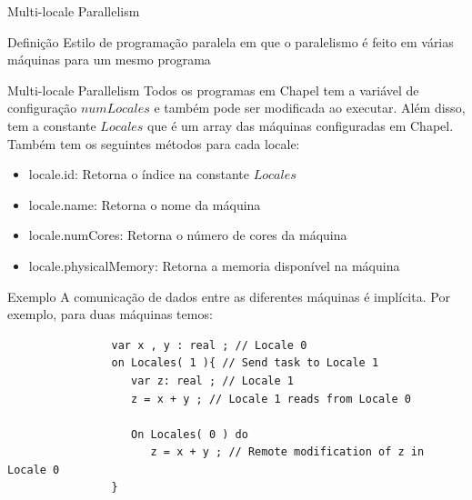 		\begin{frame}[fragile]{Multi-locale Parallelism}
			\begin{block}{Definição}
				Estilo de programação paralela em que o paralelismo é feito em várias máquinas para um mesmo programa
			\end{block}
		\end{frame}
		\begin{frame}{Multi-locale Parallelism}
			Todos os programas em Chapel tem a variável de configuração $numLocales$ e também pode ser modificada ao executar. Além disso, tem a constante $Locales$ que é um array das máquinas configuradas em Chapel.
			Também tem os seguintes métodos para cada locale:
			\begin{itemize}
				\item locale.id: Retorna o índice na constante $Locales$
				\item locale.name: Retorna o nome da máquina
				\item locale.numCores: Retorna o número de cores da máquina
				\item locale.physicalMemory: Retorna a memoria disponível na máquina
			\end{itemize}
		\end{frame}
		\begin{frame}[fragile]{Exemplo}
			A comunicação de dados entre as diferentes máquinas é implícita. Por exemplo, para duas máquinas temos:
			\begin{lstlisting}
				var x , y : real ; // Locale 0
				on Locales( 1 ){ // Send task to Locale 1
				   var z: real ; // Locale 1
				   z = x + y ; // Locale 1 reads from Locale 0
				   
				   On Locales( 0 ) do
				      z = x + y ; // Remote modification of z in Locale 0
				}
			\end{lstlisting}
		\end{frame}
